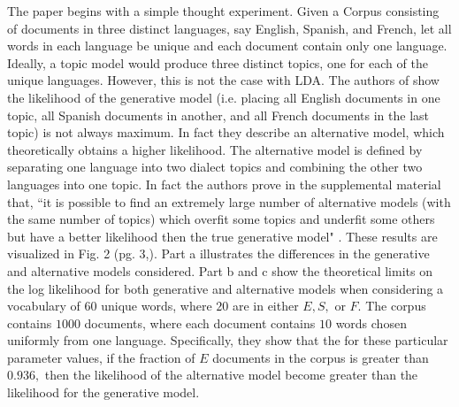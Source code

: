 \documentclass[12pt]{article}
\begin{document}
The paper \cite{main} begins with a simple thought experiment. Given a Corpus consisting of documents in three distinct languages, say English, Spanish, and French, let all words in each language be unique and each document contain only one language. Ideally, a topic model would produce three distinct topics, one for each of the unique languages. However, this is not the case with LDA. The authors of \cite{main} show the likelihood of the generative model (i.e. placing all English documents in one topic, all Spanish documents in another, and all French documents in the last topic) is not always maximum. In fact they describe an alternative model, which theoretically obtains a higher likelihood. The alternative model is defined by separating one language into two dialect topics and combining the other two languages into one topic. In fact the authors prove in the supplemental material that, ``it is possible to find an extremely large number of alternative models (with the same number of topics) which overfit some topics and underfit some others but have a better likelihood then the true generative model" \cite{mainExtra}. These results are visualized in Fig. 2 (pg. 3,\cite{main}). Part a illustrates the differences in the generative and alternative models considered. Part b and c show the theoretical limits on the log likelihood for both generative and alternative models when considering a vocabulary of $60$ unique words, where $20$ are in either $E, S,$ or $F$. The corpus contains $1000$ documents, where each document contains $10$ words chosen uniformly from one language. Specifically, they show that the for these particular parameter values, if the fraction of $E$ documents in the corpus is greater than $0.936,$ then the likelihood of the alternative model become greater than the likelihood for the generative model. 
\\
\end{document}
